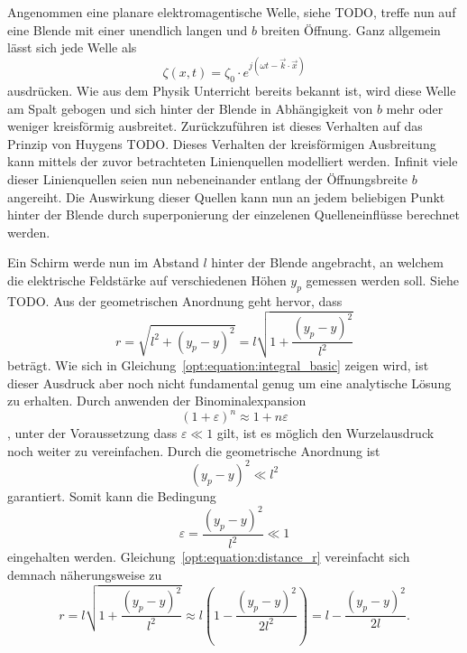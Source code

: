 Angenommen eine planare elektromagentische Welle, siehe TODO, treffe nun auf eine Blende mit einer unendlich langen und $b$ breiten Öffnung.
Ganz allgemein lässt sich jede Welle als
\begin{equation}
\zeta(x, t)
=
\zeta_0 \cdot e^{j(\omega t - \vec{k}\cdot\vec{x})}
\label{opt:equation:wave}
\end{equation}
ausdrücken.
Wie aus dem Physik Unterricht bereits bekannt ist, wird diese Welle am Spalt gebogen und sich hinter der Blende in Abhängigkeit von $b$ mehr oder weniger kreisförmig ausbreitet.
Zurückzuführen ist dieses Verhalten auf das Prinzip von Huygens TODO.
Dieses Verhalten der kreisförmigen Ausbreitung kann mittels der zuvor betrachteten Linienquellen modelliert werden.
Infinit viele dieser Linienquellen seien nun nebeneinander entlang der Öffnungsbreite $b$ angereiht.
Die Auswirkung dieser Quellen kann nun an jedem beliebigen Punkt hinter der Blende durch superponierung der einzelenen Quelleneinflüsse berechnet werden.

Ein Schirm werde nun im Abstand $l$ hinter der Blende angebracht, an welchem die elektrische Feldstärke auf verschiedenen Höhen $y_p$ gemessen werden soll.
Siehe TODO. Aus der geometrischen Anordnung geht hervor, dass
\begin{equation}
r
=
\sqrt{l^2 + (y_p-y)^2}
=
l \sqrt{1 + \frac{(y_p-y)^2}{l^2}}
\label{opt:equation:distance_r}
\end{equation}
beträgt.
Wie sich in Gleichung~\ref{opt:equation:integral_basic} zeigen wird, ist dieser Ausdruck aber noch nicht fundamental genug um eine analytische Lösung zu erhalten.
Durch anwenden der Binominalexpansion
\begin{equation}
(1 + \varepsilon)^n
\approx
1 + n\varepsilon
\end{equation}
, unter der Voraussetzung dass $\varepsilon \ll 1$ gilt, ist es möglich den Wurzelausdruck noch weiter zu vereinfachen.
Durch die geometrische Anordnung ist
\begin{equation}
(y_p-y)^2
\ll
l^2
\end{equation}
garantiert.
Somit kann die Bedingung
\begin{equation}
\varepsilon
=
\frac{(y_p-y)^2}{l^2}
\ll
1
\label{opt:equation:condition_epsilon}
\end{equation}
eingehalten werden.
Gleichung~\ref{opt:equation:distance_r} vereinfacht sich demnach näherungsweise zu
\begin{equation}
r
=
l \sqrt{1 + \frac{(y_p-y)^2}{l^2}}
\approx
l \left(1 - \frac{(y_p-y)^2}{2l^2}\right)
=
l - \frac{(y_p-y)^2}{2l}
.
\label{opt:equation:distance_r_simplified}
\end{equation}


